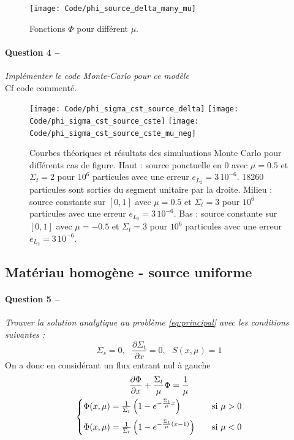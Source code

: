 \message{ !name(rapport_monte_carlo.tex)}\documentclass[12pt,a4paper]{article}
\newcommand{\dx}[1]{\dfrac{\partial #1}{\partial x}}
\newcommand{\question}[2]{\paragraph{Question #1 --}\hspace{-7pt}\textit{#2} \\}
\begin{document}
\begin{figure}[h]
  \centering
  \texttt{[image: Code/phi\_source\_delta\_many\_mu]}
  \caption{Fonctions $\Phi$ pour différent $\mu$.}
  \label{fig:delta_many_mu}
\end{figure}

\question{4}{Implémenter le code Monte-Carlo pour ce modèle}

Cf code commenté.

\begin{figure}[h]
  \centering
  \texttt{[image: Code/phi\_sigma\_cst\_source\_delta]}
  \texttt{[image: Code/phi\_sigma\_cst\_source\_cste]}
  \texttt{[image: Code/phi\_sigma\_cst\_source\_cste\_mu\_neg]}
  \caption{Courbes théoriques et résultats des simuluations Monte Carlo pour différents cas de figure.
    Haut : source ponctuelle en 0 avec $\mu=0.5$ et $\Sigma_t=2$ pour $10^6$ particules avec une erreur $e_{L_2} = 3\,10^{-6}$. 18260 particules sont sorties du segment unitaire par la droite. 
    Milieu : source constante sur $[0,1]$ avec $\mu=0.5$ et $\Sigma_t=3$ pour $10^6$ particules avec une erreur $e_{L_2} = 3\,10^{-6}$.
    Bas :  source constante sur $[0,1]$ avec $\mu=-0.5$ et $\Sigma_t=3$ pour $10^6$ particules avec une erreur $e_{L_2} = 3\,10^{-6}$.}
  \label{fig:sigmacst}
\end{figure}

\subsection{Matériau homogène - source uniforme}

\question{5}{Trouver la solution analytique au problème \autoref{eq:principal} avec les conditions suivantes :}

\begin{equation}
  \Sigma_s=0, ~~~ \dx{\Sigma_t} = 0, ~~~ S(x, \mu) = 1
\end{equation}
On a donc en considérant un flux entrant nul à gauche 
\begin{gather}
  \dx{\Phi} + \frac{\Sigma_t}{\mu} \Phi = \frac{1}{\mu} \\
  \begin{cases}
    \Phi(x, \mu)= \frac{1}{\Sigma_t}\left( 1-e^{-\frac{\Sigma_t}{\mu}x}\right) &~~~ \mbox{si } \mu>0 \medskip \\ %
    \Phi(x, \mu)= \frac{1}{\Sigma_t}\left( 1-e^{-\frac{\Sigma_t}{\mu}(x-1)}\right) &~~~ \mbox{si } \mu<0 
  \end{cases}
\end{gather}
\end{document}
